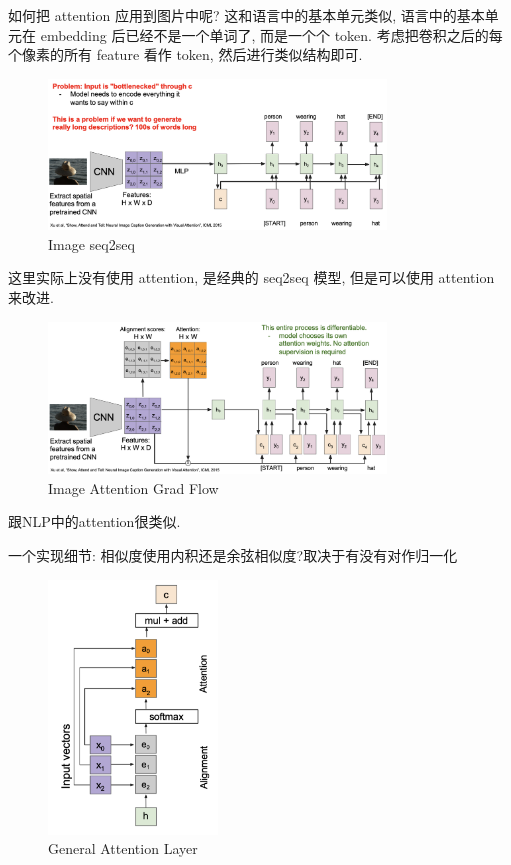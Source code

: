如何把 attention 应用到图片中呢? 这和语言中的基本单元类似, 语言中的基本单元在 embedding 后已经不是一个单词了, 而是一个个 token.
考虑把卷积之后的每个像素的所有 feature 看作 token, 然后进行类似结构即可.

\begin{figure}[htbp]
    \centering
    \includegraphics[width=0.8\textwidth]{figures/image_seq2seq.png}
    \caption{Image seq2seq}
    \label{fig:image_seq2seq}
\end{figure}

这里实际上没有使用 attention, 是经典的 seq2seq 模型, 但是可以使用 attention 来改进.

\begin{figure}[htbp]
    \centering
    \includegraphics[width=0.8\textwidth]{figures/image_attentoin.png}
    \caption{Image Attention Grad Flow}
    \label{fig:image_attentoin}
\end{figure}

跟NLP中的attention很类似.

一个实现细节: 相似度使用内积还是余弦相似度?取决于有没有对作归一化

\begin{figure}[htbp]
    \centering
    \includegraphics[width=0.4\textwidth]{figures/general_atten.png}
    \caption{General Attention Layer}
    \label{fig:general_atten}
\end{figure}

